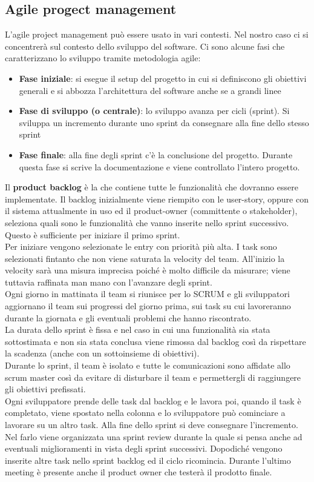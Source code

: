 \subsection{Agile progect management}
L'agile project management può essere usato in vari contesti.
Nel nostro caso ci si concentrerà sul contesto dello sviluppo del software.
Ci sono alcune fasi che caratterizzano lo sviluppo tramite metodologia agile:
\begin{itemize}[noitemsep]
    \item \textbf{Fase iniziale}: si esegue il setup del progetto in cui si definiscono gli obiettivi generali e si abbozza l'architettura del software anche se a grandi linee
    \item \textbf{Fase di sviluppo (o centrale)}: lo sviluppo avanza per cicli (sprint). Si sviluppa un incremento durante uno sprint da consegnare alla fine dello stesso sprint
    \item \textbf{Fase finale}: alla fine degli sprint c'è la conclusione del progetto. Durante questa fase si scrive la documentazione e viene controllato l'intero progetto.
\end{itemize}
Il \textbf{product backlog} è la  che contiene tutte le funzionalità che dovranno essere implementate.
Il backlog inizialmente viene riempito con le user-story, oppure con il sistema attualmente in uso ed il product-owner (committente o stakeholder), seleziona quali sono le funzionalità che vanno inserite nello sprint successivo.
Questo è sufficiente per iniziare il primo sprint.\\
Per iniziare vengono selezionate le entry con priorità più alta.
I task sono selezionati fintanto che non viene saturata la velocity del team.
All'inizio la velocity sarà una misura imprecisa poiché è molto difficile da misurare; viene tuttavia raffinata man mano con l'avanzare degli sprint.\\
Ogni giorno in mattinata il team si riunisce per lo SCRUM e gli sviluppatori aggiornano il team sui progressi del giorno prima, sui task su cui lavoreranno durante la giornata e gli eventuali problemi che hanno riscontrato.\\
La durata dello sprint è fissa e nel caso in cui una funzionalità sia stata sottostimata e non sia stata conclusa viene rimossa dal backlog così da rispettare la scadenza (anche con un sottoinsieme di obiettivi).\\
Durante lo sprint, il team è isolato e tutte le comunicazioni sono affidate allo scrum master così da evitare di disturbare il team e permettergli di raggiungere gli obiettivi prefissati.\\
Ogni sviluppatore prende delle task dal backlog e le lavora poi, quando il task è completato, viene spostato nella colonna  e lo sviluppatore può cominciare a lavorare su un altro task.
Alla fine dello sprint si deve consegnare l'incremento.
Nel farlo viene organizzata una sprint review durante la quale si pensa anche ad eventuali miglioramenti in vista degli sprint successivi.
Dopodiché vengono inserite altre task nello sprint backlog ed il ciclo ricomincia.
Durante l'ultimo meeting è presente anche il product owner che testerà il prodotto finale.\\


